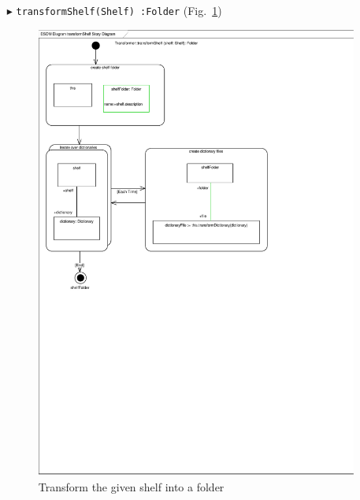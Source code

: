 \begin{enumerate}
\item[$\blacktriangleright$] \texttt{transformShelf(Shelf)~:Folder}
  (Fig.~\ref{fig:moca-transformShelf})    
\begin{figure}[!htbp]
\begin{center}
 \includegraphics[width=\textwidth]{pics/moca/4ModelToMocaTree/transformShelf}
  \caption{Transform the given shelf into a folder} 
  \label{fig:moca-transformShelf}
\end{center}
\end{figure}


\end{enumerate}
